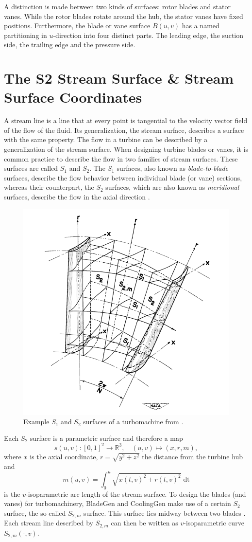 \documentclass[a4paper, 11pt]{report}
\theoremstyle{definition}
\renewcommand{\emph}[1]{\textit{#1}}
\begin{document}
	A distinction is made between two kinds of surfaces: rotor blades and stator vanes. While the rotor blades rotate around the hub, the stator vanes have fixed positions. Furthermore, the blade or vane surface $B(u,v)$ has a named partitioning in $u$-direction into four distinct parts. The leading edge, the suction side, the trailing edge and the pressure side.

\section{The S2 Stream Surface \& Stream Surface Coordinates}\label{sec:mrtheta}
	A stream line is a line that at every point is tangential to the velocity vector field of the flow of the fluid. Its generalization, the stream surface, describes a surface with the same property. The flow in a turbine can be described by a generalization of the stream surface. When designing turbine blades or vanes, it is common practice to describe the flow in two families of stream surfaces. These surfaces are called $S_1$ and $S_2$. The $S_1$ surfaces, also known as \emph{blade-to-blade} surfaces, describe the flow behavior between individual blade (or vane) sections, whereas their counterpart, the $S_2$ surfaces, which are also known as \emph{meridional} surfaces, describe the flow in the axial direction \cite{Wu1952}.

	\begin{figure}[H]
		\centering
		\includegraphics[width=.5\textwidth]{../assets/renamed_wu_naca_s2.png}
		\caption{Example $S_1$ and $S_2$ surfaces of a turbomachine from \cite{Wu1952}.}
	\end{figure}
	
	Each $S_2$ surface is a parametric surface and therefore a map
		$$s(u,v) : [0,1]^2 \rightarrow \mathbb{R}^3, \quad (u,v) \mapsto (x, r, m),$$
	where $x$ is the axial coordinate, $r = \sqrt{y^2+z^2}$ the distance from the turbine hub and 
		$$m(u,v) = \int_0^u \sqrt{x(t,v)^2 + r(t,v)^2} \; \textrm{dt}$$
	is the $v$-isoparametric arc length of the stream surface. To design the blades (and vanes) for turbomachinery, BladeGen and CoolingGen make use of a certain $S_2$ surface, the so called $S_{2,m}$ surface. This surface lies midway between two blades \cite{Wu1952}. Each stream line described by $S_{2,m}$ can then be written as $v$-isoparametric curve $S_{2,m}(\cdot, v)$.
\end{document}
